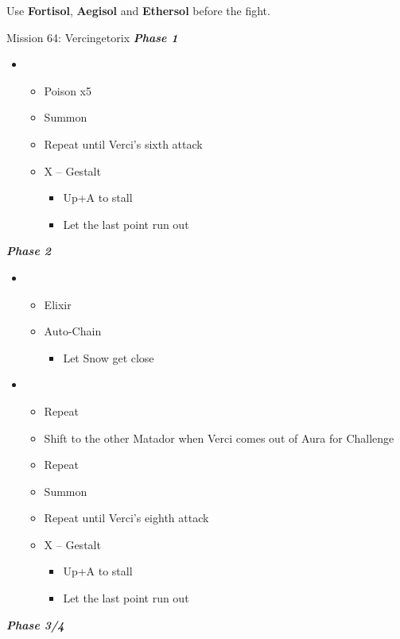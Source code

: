Use \textbf{Fortisol}, \textbf{Aegisol} and \textbf{Ethersol} before the fight.
\vfill

\begin{battle}{Mission 64: Vercingetorix}
	\textit{\textbf{Phase 1}}
	\begin{itemize}
		\item \fourth
			\begin{itemize}
				\item Poison x5
				\item Summon
				\item Repeat until Verci's sixth attack
				\item X -- Gestalt
					\begin{itemize}
						\item Up+A to stall
						\item Let the last point run out
					\end{itemize}
			\end{itemize}
	\end{itemize}
	\textit{\textbf{Phase 2}}
	\begin{itemize}
		\item \first
			\begin{itemize}
				\item Elixir
				\item Auto-Chain
					\begin{itemize}
						\item Let Snow get close
					\end{itemize}
			\end{itemize}
		\item \third
			\begin{itemize}
				\item Repeat
				\item Shift to the other Matador when Verci comes out of Aura for Challenge
				\item Repeat
				\item Summon
				\item Repeat until Verci's eighth attack
				\item X -- Gestalt
					\begin{itemize}
						\item Up+A to stall
						\item Let the last point run out
					\end{itemize}
			\end{itemize}
	\end{itemize}
	\textit{\textbf{Phase 3/4}}
	\begin{itemize}

\end{itemize}
\end{battle}
